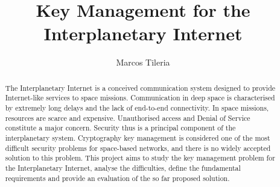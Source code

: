 \documentclass[11pt]{article} %
\title{Key Management for the Interplanetary Internet}
\author{Marcos Tileria}
\theoremstyle{plain}
\theoremstyle{definition}
\begin{document}
\maketitle




\begin{abstract}

  
The Interplanetary Internet is a conceived communication system designed to provide Internet-like services to space missions. Communication in deep space is characterised by extremely long delays and the lack of end-to-end connectivity. In space missions, resources are scarce and expensive. Unauthorised access and Denial of Service constitute a major concern. Security thus is a principal component of the interplanetary system. Cryptography key management is considered one of the most difficult security problems for space-based networks, and there is no widely accepted solution to this problem. This project aims to study the key management problem for the Interplanetary Internet, analyse the difficulties, define the fundamental requirements and provide an evaluation of the so far proposed solution.   

  
\end{abstract}




 \newpage


 \newpage


\newpage


\newpage







\clearpage
 
\printglossary[type=\acronymtype]


\end{document}
